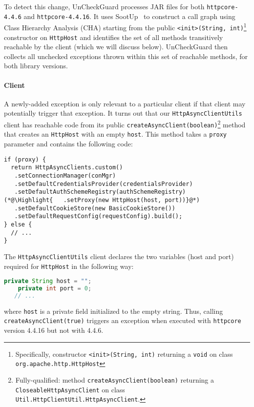 To detect this change, UnCheckGuard processes JAR files for both \texttt{httpcore-4.4.6} and \texttt{httpcore-4.4.16}. It uses SootUp~\cite{Karakaya24:_sootup} to construct a call graph using Class Hierarchy Analysis (CHA) starting from the public \texttt{<init>(String, int)}\footnote{Specifically, constructor \texttt{<init>(String, int)} returning a \texttt{void} on class \texttt{org.apache.http.HttpHost}} constructor on \texttt{HttpHost} and identifies the set of all methods transitively reachable by the client (which we will discuss below). UnCheckGuard then collects all unchecked exceptions thrown within this set of reachable methods, for both library versions.

\paragraph{Client} 
A newly-added exception is only relevant to a particular client if that client may
potentially trigger that exception.  It turns out that
our \texttt{HttpAsyncClientUtils} client has reachable code from its public \texttt{createAsyncClient(boolean)}\footnote{Fully-qualified: method \texttt{createAsyncClient(boolean)} returning a \texttt{CloseableHttpAsyncClient} on class \texttt{Util.HttpClientUtil.HttpAsyncClient}.} method
that creates an \texttt{HttpHost} with an empty \texttt{host}. This
method takes a \texttt{proxy}
parameter and contains the following code:
\begin{lstlisting}[style=javacode]
if (proxy) {
  return HttpAsyncClients.custom()
   .setConnectionManager(conMgr)
   .setDefaultCredentialsProvider(credentialsProvider)
   .setDefaultAuthSchemeRegistry(authSchemeRegistry)
(*@\Highlight{   .setProxy(new HttpHost(host, port))}@*)
   .setDefaultCookieStore(new BasicCookieStore())
   .setDefaultRequestConfig(requestConfig).build();
} else {
  // ...
}
\end{lstlisting}

The \texttt{HttpAsyncClientUtils} client declares the two variables (host and port) required for \texttt{HttpHost} in the following way:
\begin{lstlisting}[language=Java,basicstyle=\scriptsize\ttfamily]
    private String host = "";
    private int port = 0;
   // ...
\end{lstlisting}
where \texttt{host} is a private field initialized to the empty string.
Thus, calling \texttt{createAsyncClient(true)} triggers an exception when executed with
\texttt{httpcore} version 4.4.16 but not with 4.4.6.

